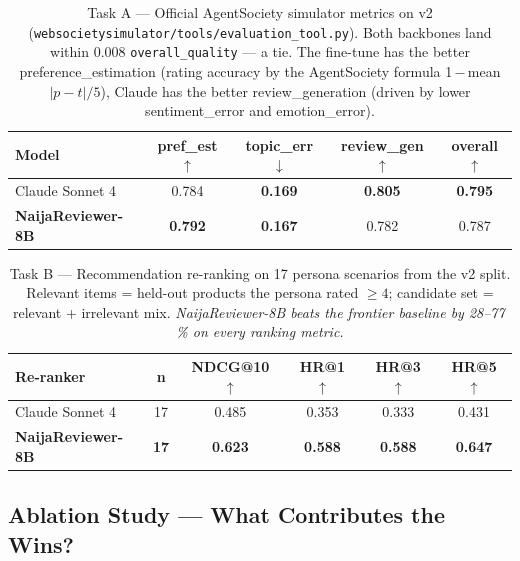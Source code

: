 \documentclass[sigconf,nonacm,balance]{acmart}
\begin{document}
\begin{table}[t]
\caption{Task A --- Official AgentSociety simulator metrics on v2
         (\texttt{websocietysimulator/tools/evaluation\_tool.py}). Both
         backbones land within 0.008 \texttt{overall\_quality} --- a tie.
         The fine-tune has the better preference\_estimation (rating
         accuracy by the AgentSociety formula 1\,$-$\,mean$|p-t|/5$),
         Claude has the better review\_generation (driven by lower
         sentiment\_error and emotion\_error).}
\label{tab:taskA-agentsociety}
\small
\begin{tabular}{lcccc}
\toprule
\textbf{Model} & \textbf{pref\_est \(\uparrow\)} & \textbf{topic\_err \(\downarrow\)} &
\textbf{review\_gen \(\uparrow\)} & \textbf{overall \(\uparrow\)} \\
\midrule
Claude Sonnet 4           & 0.784 & \textbf{0.169} & \textbf{0.805} & \textbf{0.795} \\
\textbf{NaijaReviewer-8B} & \textbf{0.792} & \textbf{0.167} & 0.782 & 0.787 \\
\bottomrule
\end{tabular}
\end{table}

\begin{table}[t]
\caption{Task B --- Recommendation re-ranking on 17 persona scenarios
         from the v2 split. Relevant items = held-out products the persona
         rated \(\geq 4\); candidate set = relevant + irrelevant mix.
         \emph{NaijaReviewer-8B beats the frontier baseline by 28–77\,\%
         on every ranking metric.}}
\label{tab:taskB}
\small
\begin{tabular}{lccccc}
\toprule
\textbf{Re-ranker} & \textbf{n} & \textbf{NDCG@10 \(\uparrow\)} &
\textbf{HR@1 \(\uparrow\)} & \textbf{HR@3 \(\uparrow\)} & \textbf{HR@5 \(\uparrow\)} \\
\midrule
Claude Sonnet 4           & 17 & 0.485 & 0.353 & 0.333 & 0.431 \\
\textbf{NaijaReviewer-8B} & \textbf{17} & \textbf{0.623} & \textbf{0.588} & \textbf{0.588} & \textbf{0.647} \\
\bottomrule
\end{tabular}
\end{table}

\subsection{Ablation Study --- What Contributes the Wins?}
\label{sec:ablation}
\end{document}
